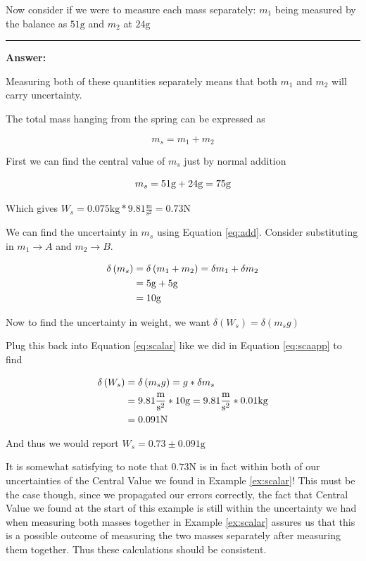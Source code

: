\documentclass{article}
\begin{document}
\begin{example}
  Now consider if we were to measure each mass separately: $m_1$ being measured by the balance as $51 \mathrm{g}$ and $m_2$ at $24 \mathrm{g}$

  \medskip
  \hrule
  \medskip

  \textbf{Answer:}

  Measuring both of these quantities separately means that both $m_1$ and $m_2$ will carry uncertainty.

  The total mass hanging from the spring can be expressed as

  \begin{equation}
    m_s = m_1 + m_2
  \end{equation}

  First we can find the central value of $m_s$ just by normal addition

  \begin{equation}
    m_s = 51 \mathrm{g} + 24 \mathrm{g} = 75 \mathrm{g}\notag
  \end{equation}

  Which gives $W_s=0.075\mathrm{kg}*9.81 \frac{\mathrm{m}}{\mathrm{s}^2} = 0.73 \mathrm{N}$

  We can find the uncertainty in $m_s$ using Equation \eqref{eq:add}.  Consider substituting in $m_1 \rightarrow A$ and $m_2 \rightarrow B$.

  \begin{align}
    \delta\left(m_s\right) &= \delta\left(m_1 + m_2\right) = \delta m_1 + \delta m_2\\
    &= 5 \mathrm{g} + 5 \mathrm{g}\notag\\
    &= 10 \mathrm{g}\notag
  \end{align}

  Now to find the uncertainty in weight, we want $\delta\left(W_s\right) = \delta\left(m_sg\right)$

  Plug this back into Equation \eqref{eq:scalar} like we did in Equation \eqref{eq:scaapp} to find

  \begin{align}
    \delta\left(W_s\right)&=\delta\left(m_sg\right) = g*\delta m_s\notag\\
    &=9.81 \frac{\mathrm{m}}{\mathrm{s}^2} * 10 \mathrm{g} = 9.81 \frac{\mathrm{m}}{\mathrm{s}^2} * 0.01 \mathrm{kg}\notag\\
    &=0.091 \mathrm{N}
  \end{align}

  And thus we would report $W_s = 0.73 \pm 0.091 \mathrm{g}$

  It is somewhat satisfying to note that $0.73 \mathrm{N}$ is in fact within both of our uncertainties of the Central Value we found in Example \ref{ex:scalar}! This must be the case though, since we propagated our errors correctly, the fact that Central Value we found at the start of this example is still within the uncertainty we had when measuring both masses together in Example \ref{ex:scalar} assures us that this is a possible outcome of measuring the two masses separately after measuring them together. Thus these calculations should be consistent.
\end{example}
\end{document}
